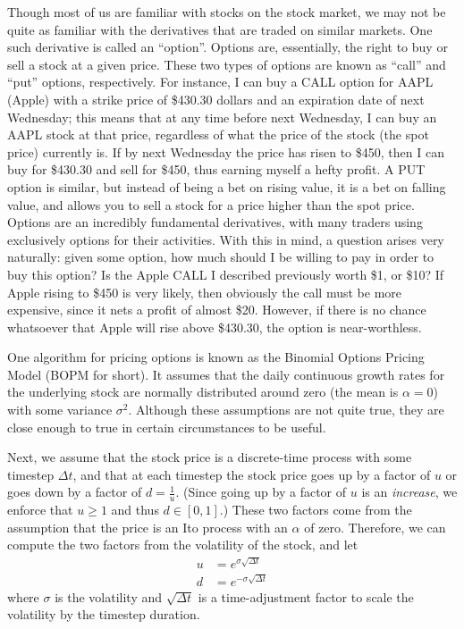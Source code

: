 \documentclass[11pt]{article}
\newcommand\nicefrac[2]{\frac{#1}{#2}}
\begin{document}
Though most of us are familiar with stocks on the stock market, we may not be
quite as familiar with the derivatives that are traded on similar markets. One
such derivative is called an ``option''. Options are, essentially, the right to
buy or sell a stock at a given price. These two types of options are known as
``call'' and ``put'' options, respectively. For instance, I can buy a CALL
option for AAPL (Apple) with a strike price of \$430.30 dollars and an
expiration date of next Wednesday; this means that at any time before next
Wednesday, I can buy an AAPL stock at that price, regardless of what the price
of the stock (the spot price) currently is. If by next Wednesday the price has
risen to \$450, then I can buy for \$430.30 and sell for \$450, thus earning
myself a hefty profit. A PUT option is similar, but instead of being a bet on
rising value, it is a bet on falling value, and allows you to sell a stock for
a price higher than the spot price. Options are an incredibly fundamental derivatives,
with many traders using exclusively options for their activities. With this in
mind, a question arises very naturally: given some option, how much should I be
willing to pay in order to buy this option? Is the Apple CALL I described
previously worth \$1, or \$10? If Apple rising to \$450 is very likely, then
obviously the call must be more expensive, since it nets a profit of almost
\$20. However, if there is no chance whatsoever that Apple will rise above
\$430.30, the option is near-worthless.

One algorithm for pricing options is known as the Binomial Options Pricing
Model (BOPM for short). It assumes that the daily continuous growth rates for
the underlying stock are normally distributed around zero (the mean is $\alpha
= 0$) with some variance $\sigma^2$. Although these assumptions are not quite true,
they are close enough to true in certain circumstances to be useful.

Next, we assume that the stock price is a discrete-time process with some timestep
$\Delta t$, and that at each timestep the stock price goes up by a factor of $u$ or goes down by a
factor of $d = \nicefrac{1}{u}$. (Since going up by a factor of $u$ is an \emph{increase}, we
enforce that $u \ge 1$ and thus $d \in [0, 1]$.) These two factors come from the assumption that the
price is an Ito process with an $\alpha$ of zero.  Therefore, we can compute
the two factors from the volatility of the stock, and let
\begin{align*}
    u &= e^{\sigma\sqrt{\Delta t}} \\
    d &= e^{-\sigma\sqrt{\Delta t}}
\end{align*}
where $\sigma$ is the volatility and $\sqrt{\Delta t}$ is a time-adjustment
factor to scale the volatility by the timestep duration. 
\end{document}
